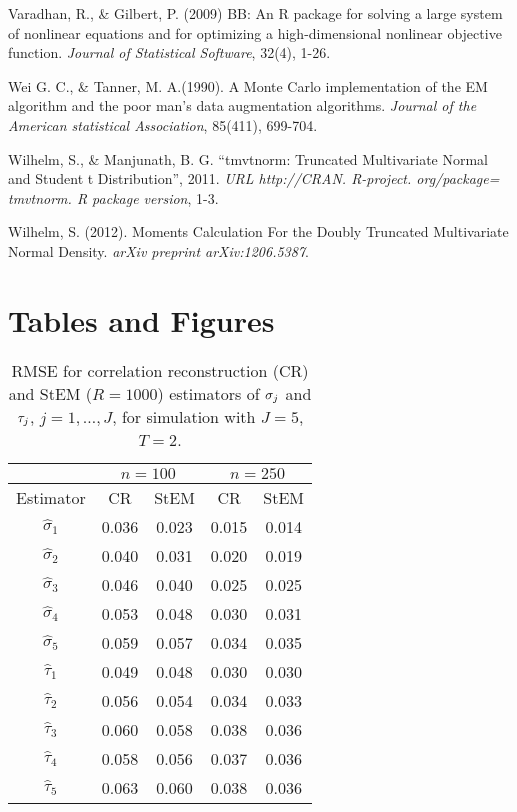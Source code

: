 \documentclass[12pt]{article}
\begin{document}
\begin{thebibliography}{99}
  Varadhan, R., \& Gilbert, P. (2009)  BB: An R package
for solving a large system of nonlinear equations and for optimizing a
high-dimensional nonlinear objective function.  \textit{Journal of
Statistical Software}, 32(4), 1-26.

  Wei G. C., \& Tanner, M. A.(1990).  A Monte Carlo
implementation of the EM algorithm and the poor man's data augmentation
algorithms.  \textit{Journal of the American statistical Association},
85(411), 699-704.

  Wilhelm, S., \& Manjunath, B. G.  ``tmvtnorm: Truncated
Multivariate Normal and Student t Distribution'', 2011.  \textit{URL
http://CRAN. R-project. org/package= tmvtnorm. R package version}, 1-3.

  Wilhelm, S. (2012).  Moments Calculation For the Doubly
Truncated Multivariate Normal Density.  \textit{arXiv preprint
arXiv:1206.5387}.
\end{thebibliography}

\pagebreak

\section{Tables and Figures}

\begin{table}[h]
\begin{center}
\begin{tabular}{|c||c|c||c|c|}
\hline
& \multicolumn{2}{|c||}{$n = 100$} & \multicolumn{2}{|c|}{$n = 250$} \\ 
\hline
Estimator & \; \; \; \; CR \; \; \; \; & StEM & \; \; \; \; CR
\; \; \; \; & StEM \\ \hline
$\hat{\sigma}_1$ & 0.036 & 0.023 & 0.015 & 0.014 \\ \hline
$\hat{\sigma}_2$ & 0.040 & 0.031 & 0.020 & 0.019 \\ \hline
$\hat{\sigma}_3$ & 0.046 & 0.040 & 0.025 & 0.025 \\ \hline
$\hat{\sigma}_4$ & 0.053 & 0.048 & 0.030 & 0.031 \\ \hline
$\hat{\sigma}_5$ & 0.059 & 0.057 & 0.034 & 0.035 \\ \hline\hline
$\hat{\tau}_1$ & 0.049 & 0.048 & 0.030 & 0.030 \\ \hline
$\hat{\tau}_2$ & 0.056 & 0.054 & 0.034 & 0.033 \\ \hline
$\hat{\tau}_3$ & 0.060 & 0.058 & 0.038 & 0.036 \\ \hline
$\hat{\tau}_4$ & 0.058 & 0.056 & 0.037 & 0.036 \\ \hline
$\hat{\tau}_5$ & 0.063 & 0.060 & 0.038 & 0.036 \\ \hline
\end{tabular}%
\end{center}
\caption{RMSE for correlation reconstruction (CR) and StEM ($R=1000$) estimators of $\protect\sigma_j$ and $\protect\tau_j$, $j=1,\ldots,J$,
for simulation with $J = 5$, $T = 2$.}
\label{FullRhoRMSEJ5T2}
\end{table}
\end{document}
